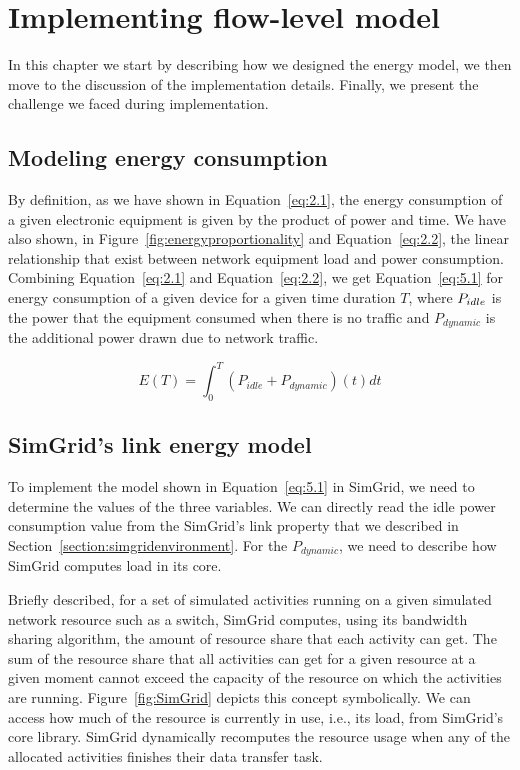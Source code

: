 \chapter{Implementing flow-level model}
\label{chapter:implementation}

In this chapter we start by describing how we designed the energy model, we then move to the discussion of the implementation details. Finally, we present the challenge we faced during implementation. 

\section{Modeling energy consumption}
By definition, as we have shown in Equation~\ref{eq:2.1}, the energy consumption of a given electronic equipment is given by the product of power and time. We have also shown, in Figure~\ref{fig:energyproportionality} and Equation~\ref{eq:2.2}, the linear relationship that exist between network equipment load and power consumption. Combining Equation~\ref{eq:2.1} and Equation~\ref{eq:2.2}, we get Equation~\ref{eq:5.1} for energy consumption of a given device for a given time duration $T$, where \($$P_{idle}$$\) is the power that the equipment consumed when there is no traffic and \(P_{dynamic}\) is the additional power drawn due to network traffic.

\begin{equation} \label{eq:5.1}
E(T) =  \int_{0}^{T} (P_{idle} + P_{dynamic})(t) dt 
\end{equation} 


\section{SimGrid's link energy model}
To implement the model shown in Equation~\ref{eq:5.1} in SimGrid, we need to determine the values of the three variables. We can directly read the idle power consumption value from the SimGrid's link property that we described in Section~\ref{section:simgridenvironment}. For the \(P_{dynamic}\), we need to describe how SimGrid computes load in its core. 

Briefly described, for a set of simulated activities running on a given simulated network resource such as a switch, SimGrid computes, using its bandwidth sharing algorithm, the amount of resource share that each activity can get. The sum of the resource share that all activities can get for a given resource at a given moment cannot exceed the capacity of the resource on which the activities are running. Figure~\ref{fig:SimGrid} depicts this concept symbolically. We can access how much of the resource is currently in use, i.e., its load, from SimGrid's core library. SimGrid dynamically recomputes the resource usage when any of the allocated activities finishes their data transfer task. 

